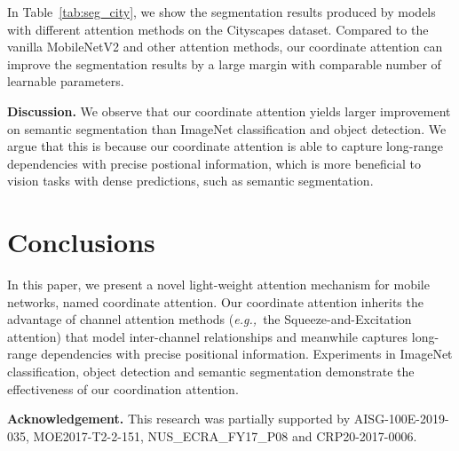 \documentclass[final]{cvpr}
\def\eg{\emph{e.g.,~}}
\newcommand{\myPara}[1]{\vspace{.05in}\noindent\textbf{#1.}}
\begin{document}
In Table~\ref{tab:seg_city}, we show the segmentation
results produced by models with different 
attention methods on the Cityscapes dataset.
%
Compared to the vanilla MobileNetV2 and
other attention methods, our coordinate attention can improve the segmentation results
by a large margin with comparable number of learnable parameters.

\myPara{Discussion}
We observe that our coordinate attention
yields larger improvement on semantic
segmentation than ImageNet classification 
and object detection.
%
We argue that this is because our coordinate
attention is able to capture long-range
dependencies with precise postional information,
which is more beneficial to vision tasks with
dense predictions, such as semantic segmentation.

\section{Conclusions}

In this paper, we present a novel light-weight
attention mechanism for mobile networks, named
coordinate attention.
%
Our coordinate attention inherits the
advantage of channel attention methods
(\eg the Squeeze-and-Excitation attention)
that model inter-channel relationships
and meanwhile captures long-range dependencies
with precise positional information.
%
Experiments in ImageNet classification, object
detection and semantic segmentation demonstrate
the effectiveness of our coordination
attention.


\myPara{Acknowledgement}
This research was partially supported by AISG-100E-2019-035, MOE2017-T2-2-151, NUS\_ECRA\_FY17\_P08 and CRP20-2017-0006.


{\small


}
\end{document}
